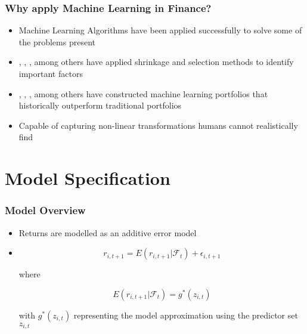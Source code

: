 \documentclass[]{beamer}
\begin{document}
\begin{frame}
\frametitle{Why apply Machine Learning in Finance?}
\begin{itemize}
	\item Machine Learning Algorithms have been applied successfully to solve some of the problems present
	\item \cite{kozak_shrinking_2017}, \cite{rapach_forecasting_2013}, \cite{freyberger_dissecting_2017}, among others have applied shrinkage and selection methods to identify important factors
	\item \cite{gu_empirical_2018}, \cite{hsu_finding_2014}, \cite{feng_deep_2018}, among others have constructed machine learning portfolios that historically outperform traditional portfolios
	\item Capable of capturing non-linear transformations humans cannot realistically find
\end{itemize}
\end{frame}

\section{Model Specification}

\begin{frame}
\frametitle{Model Overview}
\begin{itemize}
	\item Returns are modelled as an additive error model
	\item
		\begin{equation}
		r_{i, t+1} = E(r_{i, t+1} | \mathcal{F}_t) + \epsilon_{i, t+1}
		\end{equation}
		
		where 
		
		\begin{equation}
		E(r_{i, t+1} | \mathcal{F}_t) = g^*(z_{i,t})
		\end{equation}
		
		with $g^*(z_{i,t})$ representing the model approximation using the predictor set $z_{i,t}$
\end{itemize}
\end{frame}

\end{document}
